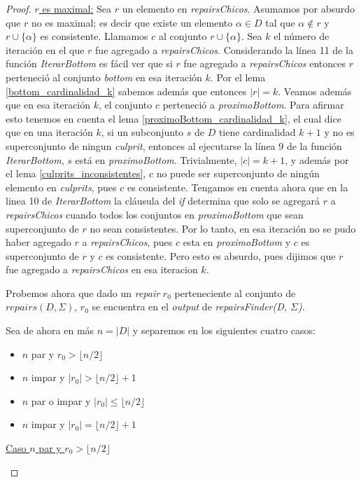 \documentclass[11pt,a4paper,twoside]{tesis}
\newcommand{\parteEntera}{\lfloor n/2 \rfloor}
\begin{document}
\begin{proof}
\underline{$r$ es maximal:} Sea $r$ un elemento en \textit{repairsChicos}. Asumamos por absurdo que $r$ no es maximal; es decir que existe un elemento $\alpha \in D$ tal que $\alpha \not\in r$ y $r \cup \{\alpha\}$ es consistente. Llamamos $c$ al conjunto $r \cup \{\alpha\}$. Sea $k$ el número de iteración en el que $r$ fue agregado a \textit{repairsChicos}. Considerando la línea 11 de la función \textit{IterarBottom} es fácil ver que si $r$ fue agregado a \textit{repairsChicos} entonces $r$ perteneció al conjunto \textit{bottom} en esa iteración $k$. Por el lema \ref{bottom_cardinalidad_k} sabemos además que entonces $|r| = k$. Veamos además que en esa iteración $k$, el conjunto $c$ perteneció a \textit{proximoBottom}. Para afirmar esto tenemos en cuenta el lema \ref{proximoBottom_cardinalidad_k}, el cual dice que en una iteración $k$, si un subconjunto $s$ de $D$ tiene cardinalidad $k+1$ y no es superconjunto de ningun \textit{culprit}, entonces al ejecutarse la línea 9 de la función \textit{IterarBottom}, $s$ está en \textit{proximoBottom}. Trivialmente, $|c| = k+1$, y además por el lema \ref{culprits_inconsistentes}, $c$ no puede ser superconjunto de ningún elemento en \textit{culprits}, pues $c$ es consistente.
Tengamos en cuenta ahora que en la linea 10 de \textit{IterarBottom} la cláusula del \textit{if} determina que solo se agregará $r$ a \textit{repairsChicos} cuando todos los conjuntos en \textit{proximoBottom} que sean superconjunto de $r$ no sean consistentes. Por lo tanto, en esa iteración no se pudo haber agregado $r$ a \textit{repairsChicos}, pues $c$ esta en \textit{proximoBottom} y $c$ es superconjunto de $r$ y $c$ es consistente. Pero esto es absurdo, pues dijimos que $r$ fue agregado a \textit{repairsChicos} en esa iteracion $k$.

Probemos ahora que dado un \textit{repair} $r_0$ perteneciente al conjunto de $repairs(D, \Sigma)$, $r_0$ se encuentra en el \textit{output} de \textit{repairsFinder(D, $\Sigma$)}.

Sea de ahora en más $n = |D|$ y separemos en los siguientes cuatro casos:

\begin{itemize}
    \item $n$ par y $r_0 > \parteEntera$
    \item $n$ impar y $|r_0| > \parteEntera + 1$
    \item $n$ par o impar y  $|r_0| \leq \parteEntera$
    \item $n$ impar y $|r_0| = \parteEntera + 1$
\end{itemize}
\begin{center}
 \underline{Caso $n$ par y $r_0 > \parteEntera$}
 \end{center}
 

\end{proof}
\end{document}
